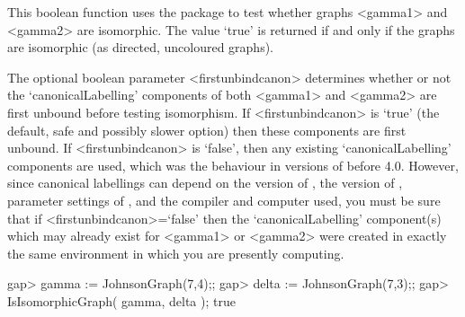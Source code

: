 This boolean function uses the {\nauty} package to test whether graphs
<gamma1> and <gamma2> are isomorphic. The value `true' is returned if
and only if the graphs are isomorphic (as directed, uncoloured
graphs).

The optional boolean parameter <firstunbindcanon> determines whether or
not the `canonicalLabelling' components of both <gamma1> and <gamma2>
are first unbound before testing isomorphism.  If <firstunbindcanon>
is `true' (the default, safe and possibly slower option) then these
components are first unbound.  If <firstunbindcanon> is `false', then any
existing `canonicalLabelling' components are used, which was the behaviour
in versions of {\GRAPE} before 4.0.  However, since canonical labellings
can depend on the version of {\nauty}, the version of {\GRAPE}, parameter
settings of {\nauty}, and the compiler and computer used, you must be
sure that if <firstunbindcanon>=`false' then the `canonicalLabelling'
component(s) which may already exist for <gamma1> or <gamma2> were created
in exactly the same environment in which you are presently computing.

\beginexample
gap> gamma := JohnsonGraph(7,4);;
gap> delta := JohnsonGraph(7,3);;
gap> IsIsomorphicGraph( gamma, delta );
true 
\endexample
